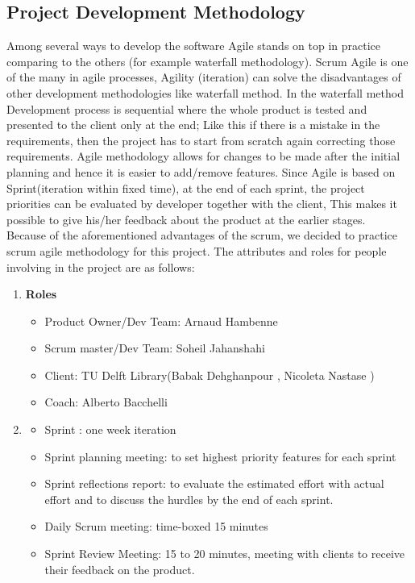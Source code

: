 \subsection{Project Development Methodology} %
Among several ways to develop the software Agile stands on top in practice comparing to the others (for example waterfall methodology). Scrum Agile is one of the many in agile processes, Agility (iteration) can solve the disadvantages of other development methodologies like waterfall method. In the waterfall method Development process is sequential where the whole product is tested and presented to the client only at the end; Like this if there is a mistake in the requirements, then the project has to start from scratch again correcting those requirements. Agile methodology allows for changes to be made after the initial planning and hence it is easier to add/remove features. Since Agile is based on Sprint(iteration within fixed time), at the end of each sprint, the project priorities can be evaluated by developer together with the client, This makes it possible to give his/her feedback about the product at the earlier stages.\\
Because of the aforementioned advantages of the scrum, we decided to practice scrum agile methodology for this project. The attributes and roles for people involving in the project are as follows:

\begin{enumerate}
	\item \textbf{Roles}
		\begin{itemize}
			
			\item Product Owner/Dev Team: Arnaud Hambenne
			\item Scrum master/Dev Team: Soheil Jahanshahi
			\item Client: TU Delft Library(Babak Dehghanpour , Nicoleta Nastase )
			\item Coach: Alberto Bacchelli
		\end{itemize}
	\item \textbf{\color{red}{TODO}}	
\begin{itemize}
		\item Sprint : one week iteration
		\item Sprint planning meeting: to set highest priority features for each sprint 
		\item Sprint reflections report: to evaluate the estimated effort with actual effort and to discuss the hurdles by the end of each sprint.
		\item Daily Scrum meeting: time-boxed 15 minutes
		\item Sprint Review Meeting: 15 to 20 minutes, meeting with clients to receive their feedback on the product.
		
\end{itemize} 
\end{enumerate}
